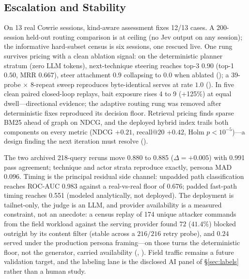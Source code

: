 \subsection{Escalation and Stability}
\label{sec:jeveval}
On 13 real Cowrie sessions, kind-aware assessment fixes 12/13 cases. A
200-session held-out routing comparison is at ceiling (no Jev output on
any session); the informative hard-subset census is six sessions, one
rescued live. One rung survives pricing with a clean ablation signal: on the
deterministic planner stratum (zero LLM tokens), next-technique steering
reaches top-3 $0.90$ (top-1 $0.50$, MRR $0.667$), steer attachment $0.9$
collapsing to $0.0$ when ablated ();
a 39-probe $\times$ 8-repeat sweep reproduces byte-identical serves at
rate $1.0$ (). In five clean paired closed-loop replays, bait exposure rises 4 to 9
(+125\%) at equal dwell---directional evidence; the adaptive routing rung
was removed after deterministic fixes reproduced its decision floor. Retrieval pricing finds sparse BM25 ahead of graph on NDCG, and the
deployed hybrid index trails both components on every metric (NDCG
$+0.21$, recall$@20$ $+0.42$, Holm $p<10^{-5}$)---a design finding the
next iteration must resolve ().




The two archived 218-query reruns move 0.880 to 0.885 ($\Delta=+0.005$)
with 0.991 pass agreement; technique and actor strata reproduce exactly,
persona MAD 0.096. Timing is the principal residual side channel:
unpadded path classification reaches ROC-AUC 0.983 against a real-vs-real
floor of 0.676; padded fast-path timing reaches 0.551 (modeled
analytically, not deployed). The deployment is
tailnet-only, the judge is an LLM,
and provider availability is a measured constraint, not an anecdote: a
census replay of 174 unique attacker commands from the field workload
against the serving provider found $72$ ($41.4\%$) blocked outright by its
content filter (stable across a $216/216$ retry probe), and $0.24$ served
under the production persona framing---on those turns the deterministic
floor, not the generator, carried availability
(,
). Field traffic
remains a future validation target, and the labeling lane is the disclosed
AI panel of \S\ref{sec:labels} rather than a human study.

